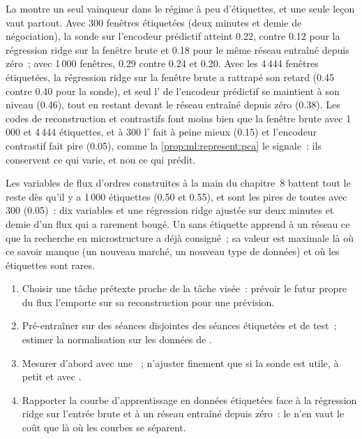 La  montre un seul vainqueur dans le régime à peu d'étiquettes, et une seule leçon vaut partout. Avec 300 fenêtres étiquetées
(deux minutes et demie de négociation), la sonde sur l'encodeur prédictif atteint 0.22, contre 0.12 pour la régression ridge
sur la fenêtre brute et 0.18 pour le même réseau entraîné depuis zéro~; avec 1\,000 fenêtres, 0.29 contre 0.24 et 0.20. Avec
les 4\,444 fenêtres étiquetées, la régression ridge sur la fenêtre brute a rattrapé son retard (0.45 contre 0.40 pour la sonde), et seul l'
de l'encodeur prédictif se maintient à son niveau (0.46), tout en restant devant le réseau entraîné depuis zéro (0.38). Les codes de reconstruction et
contrastifs font moins bien que la fenêtre brute avec 1\,000 et 4\,444 étiquettes, et à 300 l' fait à peine mieux
(0.15) et l'encodeur contrastif fait pire (0.05), comme la \cref{prop:ml:represent:pca} le signale~: ils conservent ce qui varie, et non ce qui
prédit.

Les variables de flux d'ordres construites à la main du chapitre~8 battent tout le reste dès qu'il y a 1\,000 étiquettes (0.50 et 0.55), et sont les
pires de toutes avec 300 (0.05)~: dix variables et une régression ridge ajustée sur deux minutes et demie d'un flux qui a rarement
bougé. Un  sans étiquette apprend à un réseau ce que la recherche en microstructure a déjà consigné~; sa valeur est
maximale là où ce savoir manque (un nouveau marché, un nouveau type de données) et où les étiquettes sont rares.

\begin{method}\label{met:ml:represent:method}
\begin{enumerate}
\item Choisir une tâche prétexte proche de la tâche visée~: prévoir le futur propre du flux l'emporte sur sa reconstruction pour une prévision.
\item Pré-entraîner sur des séances disjointes des séances étiquetées et de test~; estimer la normalisation sur les données de .
\item Mesurer d'abord avec une ~; n'ajuster finement que si la sonde est utile, à petit  et avec .
\item Rapporter la courbe d'apprentissage en données étiquetées face à la régression ridge sur l'entrée brute et à un réseau entraîné depuis zéro~: le
 n'en vaut le coût que là où les courbes se séparent.
\end{enumerate}
\end{method}

